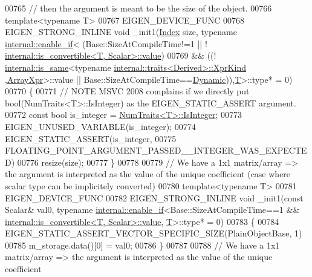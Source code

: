 \begin{DoxyCode}
00765     \textcolor{comment}{// then the argument is meant to be the size of the object.}
00766     \textcolor{keyword}{template}<\textcolor{keyword}{typename} T>
00767     EIGEN\_DEVICE\_FUNC
00768     EIGEN\_STRONG\_INLINE \textcolor{keywordtype}{void} \_init1(\hyperlink{namespace_eigen_a62e77e0933482dafde8fe197d9a2cfde}{Index} size, \textcolor{keyword}{typename} 
      \hyperlink{struct_eigen_1_1internal_1_1enable__if}{internal::enable\_if}<    (Base::SizeAtCompileTime!=1 || !
      \hyperlink{struct_eigen_1_1internal_1_1is__convertible}{internal::is\_convertible<T, Scalar>::value})
00769                                                                               && ((!
      \hyperlink{struct_eigen_1_1internal_1_1is__same}{internal::is\_same}<\textcolor{keyword}{typename} \hyperlink{struct_eigen_1_1internal_1_1traits}{internal::traits<Derived>::XprKind}
      ,\hyperlink{struct_eigen_1_1_array_xpr}{ArrayXpr}>::value || Base::SizeAtCompileTime==\hyperlink{namespace_eigen_ad81fa7195215a0ce30017dfac309f0b2}{Dynamic})),\hyperlink{group___sparse_core___module}{T}>::type* = 0)
00770     \{
00771       \textcolor{comment}{// NOTE MSVC 2008 complains if we directly put bool(NumTraits<T>::IsInteger) as the
       EIGEN\_STATIC\_ASSERT argument.}
00772       \textcolor{keyword}{const} \textcolor{keywordtype}{bool} is\_integer = \hyperlink{group___core___module_struct_eigen_1_1_num_traits}{NumTraits<T>::IsInteger};
00773       EIGEN\_UNUSED\_VARIABLE(is\_integer);
00774       EIGEN\_STATIC\_ASSERT(is\_integer,
00775                           FLOATING\_POINT\_ARGUMENT\_PASSED\_\_INTEGER\_WAS\_EXPECTED)
00776       resize(size);
00777     \}
00778     
00779     \textcolor{comment}{// We have a 1x1 matrix/array => the argument is interpreted as the value of the unique coefficient
       (case where scalar type can be implicitely converted)}
00780     \textcolor{keyword}{template}<\textcolor{keyword}{typename} T>
00781     EIGEN\_DEVICE\_FUNC
00782     EIGEN\_STRONG\_INLINE \textcolor{keywordtype}{void} \_init1(\textcolor{keyword}{const} Scalar& val0, \textcolor{keyword}{typename} 
      \hyperlink{struct_eigen_1_1internal_1_1enable__if}{internal::enable\_if}<Base::SizeAtCompileTime==1 && 
      \hyperlink{struct_eigen_1_1internal_1_1is__convertible}{internal::is\_convertible<T, Scalar>::value},
      \hyperlink{group___sparse_core___module}{T}>::type* = 0)
00783     \{
00784       EIGEN\_STATIC\_ASSERT\_VECTOR\_SPECIFIC\_SIZE(PlainObjectBase, 1)
00785       m\_storage.data()[0] = val0;
00786     \}
00787     
00788     \textcolor{comment}{// We have a 1x1 matrix/array => the argument is interpreted as the value of the unique coefficient
}
\end{DoxyCode}
